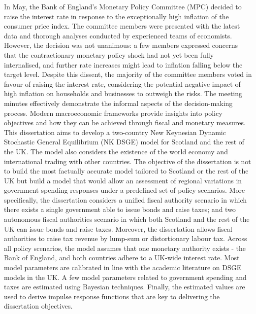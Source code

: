 In May, the Bank of England's Monetary Policy Committee (MPC) decided to raise the interest rate in response to the exceptionally high inflation of the consumer price index. The committee members were presented with the latest data and thorough analyses conducted by experienced teams of economists. However, the decision was not unanimous: a few members expressed concerns that the contractionary monetary policy shock had not yet been fully internalised, and further rate increases might lead to inflation falling below the target level. Despite this dissent, the majority of the committee members voted in favour of raising the interest rate, considering the potential negative impact of high inflation on households and businesses to outweigh the risks. The meeting minutes effectively demonstrate the informal aspects of the decision-making process. Modern macroeconomic frameworks provide insights into policy objectives and how they can be achieved through fiscal and monetary measures. This dissertation aims to develop a two-country New Keynesian Dynamic Stochastic General Equilibrium (NK DSGE) model for Scotland and the rest of the UK. The model also considers the existence of the world economy and international trading with other countries. The objective of the dissertation is not to build the most factually accurate model tailored to Scotland or the rest of the UK but build a model that would allow an assessment of regional variations in government spending responses under a predefined set of policy scenarios. More specifically, the dissertation considers a unified fiscal authority scenario in which there exists a single government able to issue bonds and raise taxes; and two autonomous fiscal authorities scenario in which both Scotland and the rest of the UK can issue bonds and raise taxes. Moreover, the dissertation allows fiscal authorities to raise tax revenue by lump-sum or distortionary labour tax. Across all policy scenarios, the model assumes that one monetary authority exists - the Bank of England, and both countries adhere to a UK-wide interest rate. Most model parameters are calibrated in line with the academic literature on DSGE models in the UK. A few model parameters related to government spending and taxes are estimated using Bayesian techniques. Finally, the estimated values are used to derive impulse response functions that are key to delivering the dissertation objectives.

